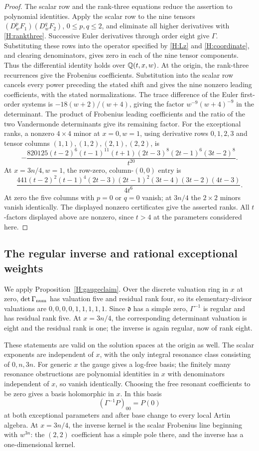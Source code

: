 \documentclass[11pt]{article}
\numberwithin{equation}{section}
\begin{document}
\begin{proof}
The scalar row and the rank-three equations reduce the assertion to polynomial identities. Apply the scalar row to the nine tensors $(D_w^pF_1)(D_w^qF_2)$, $0\leq p,q\leq2$, and eliminate all higher derivatives with \eqref{H:rankthree}. Successive Euler derivatives through order eight give $\Gamma$. Substituting these rows into the operator specified by \eqref{H:Lz} and \eqref{H:coordinate}, and clearing denominators, gives zero in each of the nine tensor components. Thus the differential identity holds over $\mathbb Q(t,x,w)$. At the origin, the rank-three recurrences give the Frobenius coefficients. Substitution into the scalar row cancels every power preceding the stated shift and gives the nine nonzero leading coefficients, with the stated normalizations. The trace difference of the Euler first-order systems is $-18(w+2)/(w+4)$, giving the factor $w^{-9}(w+4)^{-9}$ in the determinant. The product of Frobenius leading coefficients and the ratio of the two Vandermonde determinants give its remaining factor. For the exceptional ranks, a nonzero $4\times4$ minor at $x=0,w=1$, using derivative rows $0,1,2,3$ and tensor columns $(1,1),(1,2),(2,1),(2,2)$, is
\[
-\frac{820125(t-2)^6(t-1)^{11}(t+1)(2t-3)^8(2t-1)^6(3t-2)^8}{t^{20}}.
\]
At $x=3n/4,w=1$, the row-zero, column-$(0,0)$ entry is
\[
\frac{441(t-2)^2(t-1)^4(2t-3)(2t-1)^2(3t-4)(3t-2)(4t-3)}{4t^6}.
\]
At zero the five columns with $p=0$ or $q=0$ vanish; at $3n/4$ the $2\times2$ minors vanish identically. The displayed nonzero certificates give the asserted ranks. All $t$-factors displayed above are nonzero, since $t>4$ at the parameters considered here.
\end{proof}

\subsection{The regular inverse and rational exceptional weights}
We apply Proposition~\ref{H:gaugeclaim}. Over the discrete valuation ring in $x$ at zero, $\det\Gamma_{\rm num}$ has valuation five and residual rank four, so its elementary-divisor valuations are $0,0,0,0,1,1,1,1,1$. Since $\mathfrak d$ has a simple zero, $\Gamma^{-1}$ is regular and has residual rank five. At $x=3n/4$, the corresponding determinant valuation is eight and the residual rank is one; the inverse is again regular, now of rank eight.

These statements are valid on the solution spaces at the origin as well. The scalar exponents are independent of $x$, with the only integral resonance class consisting of $0,n,3n$. For generic $x$ the gauge gives a log-free basis; the finitely many resonance obstructions are polynomial identities in $x$ with denominators independent of $x$, so vanish identically. Choosing the free resonant coefficients to be zero gives a basis holomorphic in $x$. In this basis
\[
(\Gamma^{-1}P)_{00}=P(0)
\]
at both exceptional parameters and after base change to every local Artin algebra. At $x=3n/4$, the inverse kernel is the scalar Frobenius line beginning with $w^{3n}$: the $(2,2)$ coefficient has a simple pole there, and the inverse has a one-dimensional kernel.
\end{document}
